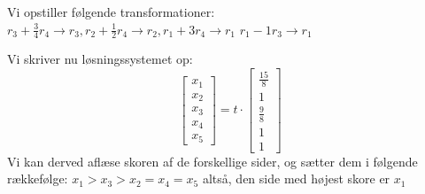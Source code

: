 \documentclass[a4paper,fleqn]{article}
\begin{document}
	Vi opstiller følgende transformationer:\\
$r_3 + \frac{3}{4}r_4 \rightarrow r_3, r_2 + \frac{1}{2}r_4 \rightarrow r_2, r_1 + 3r_4 \rightarrow r_1$
$r_1 -1r_3 \rightarrow r_1$

	Vi skriver nu løsningssystemet op:
\[
	\begin{bmatrix}x_1\\x_2\\x_3\\x_4\\x_5\end{bmatrix} =
	t\cdot \begin{bmatrix}\frac{15}{8}\\1\\\frac{9}{8}\\1\\1\end{bmatrix}
\]
	Vi kan derved aflæse skoren af de forskellige sider, og sætter dem i følgende rækkefølge:
	$x_1 > x_3 > x_2 = x_4 = x_5$ altså, den side med højest skore er $x_1$
\end{document}
